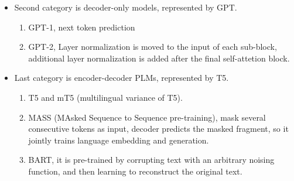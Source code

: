 \documentclass[10pt]{elegantbook}
\begin{document}
\begin{itemize}
    \item Second category is decoder-only models, represented by GPT.
    \begin{enumerate}
        \item GPT-1, next token prediction
        \item GPT-2, Layer normalization is moved to the input of each sub-block, additional layer normalization is added
after the final self-attetion block.
    \end{enumerate}

    \item Last category is encoder-decoder PLMs, represented by T5.
    \begin{enumerate}
        \item T5 and mT5 (multilingual variance of T5).
        \item MASS (MAsked Sequence to Sequence pre-training), mask several consecutive tokens as input, decoder predicts
the masked fragment, so it jointly trains language embedding and generation.
        \item BART, it is pre-trained by corrupting text with an arbitrary noising function, and then learning to reconstruct
the original text.
    \end{enumerate}
\end{itemize}
\end{document}
